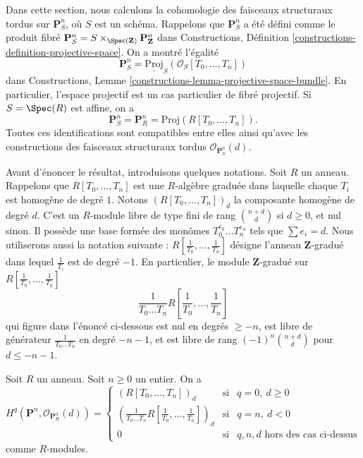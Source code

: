 \noindent
Dans cette section, nous calculons la cohomologie des faisceaux structuraux
tordus sur $\mathbf{P}^n_S$, où $S$ est un schéma.
Rappelons que $\mathbf{P}^n_S$ a été défini comme le produit fibré
$
\mathbf{P}^n_S = S \times_{\Spec(\mathbf{Z})} \mathbf{P}^n_{\mathbf{Z}}
$
dans Constructions, Définition \ref{constructions-definition-projective-space}.
On a montré l'égalité
$$
\mathbf{P}^n_S = \underline{\text{Proj}}_S(\mathcal{O}_S[T_0, \ldots, T_n])
$$
dans Constructions, Lemme \ref{constructions-lemma-projective-space-bundle}.
En particulier, l'espace projectif est un cas particulier de fibré projectif.
Si $S = \Spec(R)$ est affine, on a
$$
\mathbf{P}^n_S = \mathbf{P}^n_R = \text{Proj}(R[T_0, \ldots, T_n]).
$$
Toutes ces identifications sont compatibles entre elles ainsi qu'avec les constructions
des faisceaux structuraux tordus $\mathcal{O}_{\mathbf{P}^n_S}(d)$.

\medskip\noindent
Avant d'énoncer le résultat, introduisons quelques notations.
Soit $R$ un anneau.
Rappelons que $R[T_0, \ldots, T_n]$ est une
$R$-algèbre graduée dans laquelle chaque $T_i$ est homogène de degré $1$.
Notons $(R[T_0, \ldots, T_n])_d$ la composante homogène de degré $d$.
C'est un $R$-module libre de type fini de rang $\binom{n + d}{d}$
si $d \geq 0$, et nul sinon.
Il possède une base formée des monômes $T_0^{e_0} \ldots T_n^{e_n}$
tels que $\sum e_i = d$. Nous utiliserons aussi la notation suivante :
$R[\frac{1}{T_0}, \ldots, \frac{1}{T_n}]$ désigne l'anneau $\mathbf{Z}$-gradué
dans lequel $\frac{1}{T_i}$ est de degré $-1$. En particulier, le module
$\mathbf{Z}$-gradué sur $R[\frac{1}{T_0}, \ldots, \frac{1}{T_n}]$
$$
\frac{1}{T_0 \ldots T_n} R[\frac{1}{T_0}, \ldots, \frac{1}{T_n}]
$$
qui figure dans l'énoncé ci-dessous est nul en degrés
$\geq -n$, est libre de générateur $\frac{1}{T_0 \ldots T_n}$
en degré $-n - 1$, et est libre de rang $(-1)^n\binom{n + d}{d}$ pour
$d \leq -n - 1$.

\begin{lemma}
\label{lemma-cohomology-projective-space-over-ring}
\begin{reference}
\cite[III Proposition 2.1.12]{EGA}
\end{reference}
Soit $R$ un anneau.
Soit $n \geq 0$ un entier.
On a
$$
H^q(\mathbf{P}^n, \mathcal{O}_{\mathbf{P}^n_R}(d)) =
\left\{
\begin{matrix}
(R[T_0, \ldots, T_n])_d & \text{si} & q = 0,\ d \geq 0 \\
\left(\frac{1}{T_0 \ldots T_n} R[\frac{1}{T_0}, \ldots, \frac{1}{T_n}]\right)_d
& \text{si} & q = n,\ d < 0 \\
0 & \text{si} & q, n, d\text{ hors des cas ci-dessus}
\end{matrix}
\right.
$$
comme $R$-modules.
\end{lemma}

